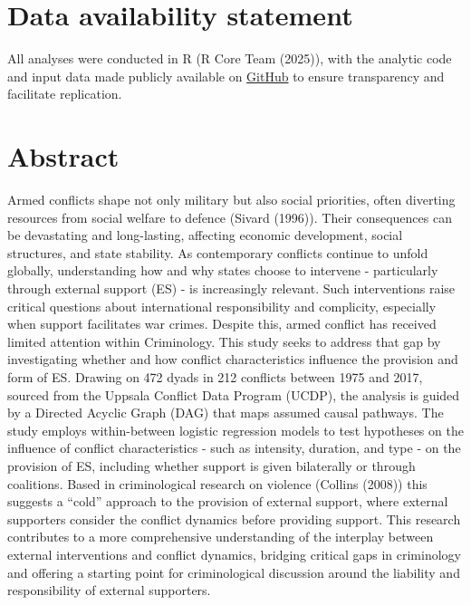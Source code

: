 \documentclass[
]{article}
\begin{document}
\newpage

\section{Data availability statement}\label{data-availability-statement}

All analyses were conducted in R (R Core Team (2025)), with the analytic
code and input data made publicly available on
\href{https://github.com/celine-felicit/Dissertation-Code}{GitHub} to
ensure transparency and facilitate replication.

\section{Abstract}\label{abstract}

Armed conflicts shape not only military but also social priorities,
often diverting resources from social welfare to defence (Sivard
(1996)). Their consequences can be devastating and long-lasting,
affecting economic development, social structures, and state stability.
As contemporary conflicts continue to unfold globally, understanding how
and why states choose to intervene - particularly through external
support (ES) - is increasingly relevant. Such interventions raise
critical questions about international responsibility and complicity,
especially when support facilitates war crimes. Despite this, armed
conflict has received limited attention within Criminology. This study
seeks to address that gap by investigating whether and how conflict
characteristics influence the provision and form of ES. Drawing on 472
dyads in 212 conflicts between 1975 and 2017, sourced from the Uppsala
Conflict Data Program (UCDP), the analysis is guided by a Directed
Acyclic Graph (DAG) that maps assumed causal pathways. The study employs
within-between logistic regression models to test hypotheses on the
influence of conflict characteristics - such as intensity, duration, and
type - on the provision of ES, including whether support is given
bilaterally or through coalitions. Based in criminological research on
violence (Collins (2008)) this suggests a ``cold'' approach to the
provision of external support, where external supporters consider the
conflict dynamics before providing support. This research contributes to
a more comprehensive understanding of the interplay between external
interventions and conflict dynamics, bridging critical gaps in
criminology and offering a starting point for criminological discussion
around the liability and responsibility of external supporters.
\end{document}
